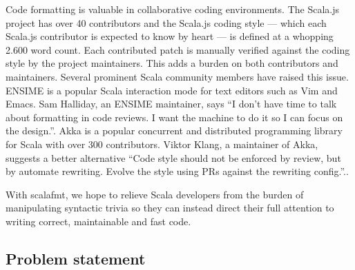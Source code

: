 Code formatting is valuable in collaborative coding environments.
The Scala.js project\autocite{_scala.js_????} has over 40 contributors and the Scala.js coding style\autocite{doeraene_scala.js_2015} --- which each Scala.js contributor is expected to know by heart --- is defined at a whopping 2.600 word count.
Each contributed patch is manually verified against the coding style by the project maintainers.
This adds a burden on both contributors and maintainers.
Several prominent Scala community members have raised this issue.
ENSIME\autocite{_ensime_????} is a popular Scala interaction mode for text editors such as Vim and Emacs.
Sam Halliday, an ENSIME maintainer, says ``I don't have time to talk about formatting in code reviews. I want the machine to do it so I can focus on the design.''\autocite{halliday_i_2016-1}.
Akka\autocite{_akka_????} is a popular concurrent and distributed programming library for Scala with over 300 contributors.
Viktor Klang, a maintainer of Akka, suggests a better alternative ``Code style should not be enforced by review, but by automate rewriting. Evolve the style using PRs against the rewriting config.''.\autocite{klang_code_2016}.

With scalafmt, we hope to relieve Scala developers from the burden of manipulating syntactic trivia so they can instead direct their full attention to writing correct, maintainable and fast code.

\subsection{Problem statement}

